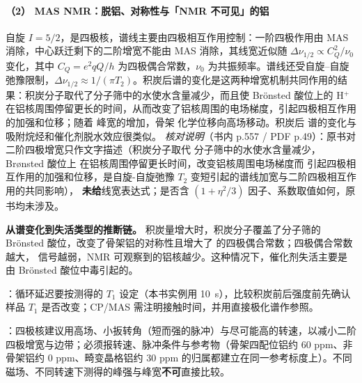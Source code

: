\paragraph{（2） MAS NMR：脱铝、对称性与「NMR 不可见」的铝}

\begin{principle}
 自旋 $I=5/2$，是四极核，谱线主要由四极相互作用控制：一阶四极作用由 MAS 消除，中心跃迁剩下的二阶增宽不能由 MAS 消除，其线宽近似随 $\Delta\nu_{1/2}\propto C_Q^{2}/\nu_0$ 变化，其中 $C_Q=e^{2}qQ/h$ 为四极偶合常数，$\nu_0$ 为共振频率。谱线还受自旋--自旋弛豫限制，$\Delta\nu_{1/2}\approx 1/(\pi T_2)$。积炭后谱的变化是这两种增宽机制共同作用的结果：积炭分子取代了分子筛中的水使水含量减少，而且使 Brönsted 酸位上的 H$^{+}$ 在铝核周围停留更长的时间，从而改变了铝核周围的电场梯度，引起四极相互作用的加强和位移；随着  峰宽的增加，骨架  化学位移向高场移动。积炭后  谱的变化与吸附烷烃和催化剂脱水效应很类似。
\emph{核对说明}（书内 p.557 / PDF p.49）：原书对二阶四极增宽只作文字描述（积炭分子取代
分子筛中的水使水含量减少，Brønsted 酸位上  在铝核周围停留更长时间，改变铝核周围电场梯度而
引起四极相互作用的加强和位移，是自旋-自旋弛豫 $T_2$ 变短引起的谱线加宽与二阶四极相互作用的共同影响），
\textbf{未给}线宽表达式；是否含 $(1+\eta^{2}/3)$ 因子、系数取值如何，原书均未涉及。

\textbf{从谱变化到失活类型的推断链。} 积炭量增大时，积炭分子覆盖了分子筛的 Brönsted 酸位，改变了骨架铝的对称性且增大了  的四极偶合常数；四极偶合常数越大， 信号越弱，NMR 可观察到的铝核越少。这种情况下，催化剂失活主要是由 Brönsted 酸位中毒引起的。
\end{principle}

\begin{measure}
：循环延迟要按测得的 $T_1$ 设定（本书实例用 \qty{10}{s}），比较积炭前后强度前先确认样品 $T_1$ 是否改变；CP/MAS 需注明接触时间，并用直接极化谱作参照。

：四极核建议用高场、小扳转角（短而强的脉冲）与尽可能高的转速，以减小二阶四极增宽与边带；必须报转速、脉冲条件与参考物（骨架四配位铝约 60 ppm、非骨架铝约 0 ppm、畸变晶格铝约 30 ppm 的归属都建立在同一参考标度上）。不同磁场、不同转速下测得的峰强与峰宽\textbf{不可}直接比较。
\end{measure}

